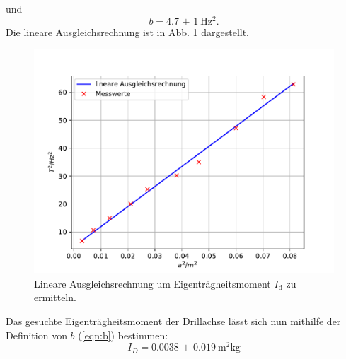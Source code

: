und
\begin{equation*}
    b = \SI{4.7(10)}{\hertz^2} .
\end{equation*}
Die lineare Ausgleichsrechnung ist in Abb. \ref{fig:ausgleich} dargestellt.
\begin{figure}
    \centering
    \includegraphics[width=\textwidth]{content/data/ausgleich.pdf}
    \caption{Lineare Ausgleichsrechnung um Eigenträgheitsmoment $I_\text{d}$ zu ermitteln.}
    \label{fig:ausgleich}
\end{figure}
Das gesuchte Eigenträgheitsmoment der Drillachse lässt sich nun mithilfe der Definition von $b$ (\autoref{eqn:b}) bestimmen:
\begin{equation*}
    I_D = \SI{0.0038(190)}{\metre^2\kg}
\end{equation*}

\FloatBarrier

